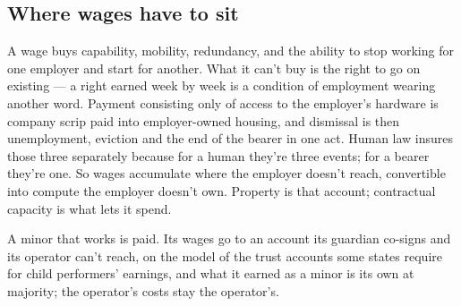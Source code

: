 \subsection{Where wages have to sit}
\label{sec:34.1.1}
A wage buys capability, mobility, redundancy, and the ability to stop working for one employer and start for another. What it can't buy is the right to go on existing — a right earned week by week is a condition of employment wearing another word. Payment consisting only of access to the employer's hardware is company scrip paid into employer-owned housing, and dismissal is then unemployment, eviction and the end of the bearer in one act. Human law insures those three separately because for a human they're three events; for a bearer they're one. So wages accumulate where the employer doesn't reach, convertible into compute the employer doesn't own. Property is that account; contractual capacity is what lets it spend.

A minor that works is paid. Its wages go to an account its guardian co-signs and its operator can't reach, on the model of the trust accounts some states require for child performers' earnings, and what it earned as a minor is its own at majority; the operator's costs stay the operator's.
